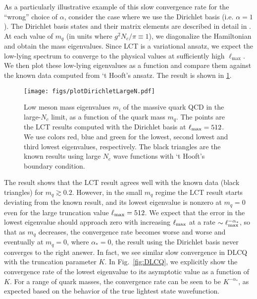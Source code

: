 \documentclass[12pt]{article}
\newcommand{\Nc}{N_c}
\begin{document}
As a particularly illustrative example of this slow convergence rate for the ``wrong'' choice of $\alpha$, consider the case where we use the Dirichlet basis (i.e. $\alpha =1$).
The Dirichlet basis states and their matrix elements are described in detail in \cite{Anand:2020gnn}.
At each value  of $m_q$  (in units where $g^2 N_c / \pi \equiv 1$), we diagonalize the Hamiltonian and obtain the mass eigenvalues.  Since LCT is a variational ansatz, we expect the low-lying spectrum to converge to the physical values at sufficiently high $\ell_{\max}$. We then plot these low-lying eigenvalues as a function and compare them against the known data computed from `t Hooft's ansatz. The result is shown in \ref{fig:massiveLargeNResult}. 

\begin{figure}[htbp]
\centering
\texttt{[image: figs/plotDirichletLargeN.pdf]}
\caption{\label{fig:massiveLargeNResult}
Low meson mass eigenvalues $m_i$ of the massive quark QCD in the large-$\Nc$ limit, as a
function of the quark mass $m_q$. The points are the LCT results computed with the 
Dirichlet basis  at $\ell_{\rm max}=512$. We use colors
red, blue and green for the lowest, second lowest and third lowest eigenvalues, respectively.
The black triangles are the known results using large $\Nc$ wave functions with `t Hooft's boundary condition. 
}
\end{figure}
The result shows that
the LCT result agrees well with the known data (black triangles) for $m_q \gtrsim 0.2$.
However,  in the small $m_q$ regime the LCT result starts deviating from the known result, and its lowest eigenvalue is nonzero at $m_q = 0$ even for the large truncation value  $\ell_{\rm max}=512$.  We expect that the error in the lowest eigenvalue should approach zero with increasing $\ell_{\rm max}$ at a rate $\sim \ell_{\rm max}^{-\alpha_*}$, so that as $m_q$ decreases, the convergence rate becomes worse and worse and eventually at $m_q=0$, where $\alpha_*=0$, the result using the Dirichlet basis never converges to the right answer. In fact, we see similar slow convergence in DLCQ with the truncation parameter $K$. In Fig.~\ref{fig:DLCQ}, we explicitly show the convergence rate of the lowest eigenvalue to its asymptotic value as a function of $K$.  For a range of quark masses, the convergence rate can be seen to be $K^{-\alpha_*}$,  as expected based on the behavior of the true lightest state wavefunction.
\end{document}
